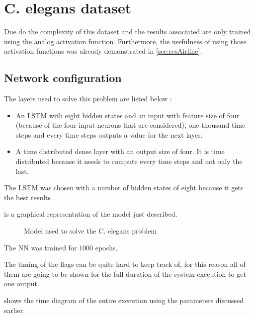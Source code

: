 \section{\acs{C. elegans} dataset}
\label{sec:resCelegans}

Due do the complexity of this dataset and the results associated are only trained using the analog activation function. Furthermore, the usefulness of using those activation functions was already demonstrated in \cref{sec:resAirline}.

\subsection{Network configuration}

The layers used to solve this problem are listed below :

\begin{itemize}
  \item An \ac{LSTM} with eight hidden states and an input with feature size of four (because of the four input neurons that are considered), one thousand time steps and every time steps outputs a value for the next layer.
  \item A time distributed dense layer with an output size of four. It is time distributed because it needs to compute every time steps and not only the last.
\end{itemize}

The \ac{LSTM} was chosen with a number of hidden states of eight because it gets the best results \cite{celegans}.

 is a graphical representation of the model just described.

\begin{figure}[H]
  \centering
  
  \caption{Model used to solve the \ac{C. elegans} problem}
  \label{fig:celegansModel}
\end{figure}

The \ac{NN} was trained for $1000$ epochs.

The timing of the flags can be quite hard to keep track of, for this reason all of them are going to be shown for the full duration of the system execution to get one output.

 shows the time diagram of the entire execution using the parameters discussed earlier.


